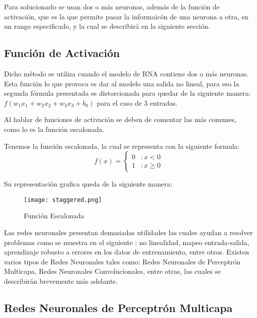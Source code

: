     Para solucionarlo se usan dos o más neuronas, además de la función de activación, que es la que permite pasar la informaicón de una neurona a otra, en un rango especificado, y la cual se describirá en la siguiente sección.

    \subsection{Función de Activación} \label{sec: activation}

      Dicho método se utiliza cuando el modelo de RNA contiene dos o más neuronas.
      Esta función lo que provoca es dar al modelo una salida no lineal, para eso la segunda fórmula presentada es distorcionada para quedar de la siguiente manera: $f( w_1x_1 + w_2x_2 + w_3x_3 + b_0)$ para el caso de 3 entradas.
      
      Al hablar de funciones de activación se deben de comentar las más comunes, como lo es la función escalonada.

      Tenemos la función escalonada, la cual se representa con la siguiente formula: 
      \[f(x) = \left\{ \begin{array}{lr} 0 & : x < 0\\ 1 & : x \ge 0 \end{array} \right. \]

      Su representación grafica queda de la siguiente manera:
      \begin{figure}[H]
        \centering
        \texttt{[image: staggered.png]}
        \caption{Función Escalonada}
        \label{fig:Función Escalonada}
      \end{figure}

      Las redes neuronales presentan demasiadas utilidades las cuales ayudan a resolver problemas como se muestra en el siguiente \cite{liu2015}: no linealidad, mapeo entrada-salida, aprendizaje robusto a errores en los datos de entrenamiento, entre otros.  Existen varios tipos de Redes Neuronales tales como: Redes Neuronales de Perceptr\'on Multicapa, Redes Neuronales Convolucionales, entre otras, las cuales se describirán brevemente más adelante.
      
      \subsection{Redes Neuronales de Perceptr\'on Multicapa}

